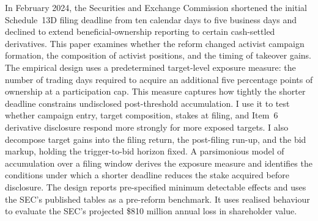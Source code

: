In February 2024, the Securities and Exchange Commission shortened the initial
Schedule~13D filing deadline from ten calendar days to five business days and
declined to extend beneficial-ownership reporting to certain cash-settled
derivatives. This paper examines whether the reform changed activist campaign
formation, the composition of activist positions, and the timing of takeover
gains. The empirical design uses a predetermined target-level exposure measure:
the number of trading days required to acquire an additional five percentage
points of ownership at a participation cap. This measure captures how tightly
the shorter deadline
constrains undisclosed post-threshold accumulation. I use it to test whether
campaign entry, target composition, stakes at filing, and Item~6 derivative
disclosure respond more strongly for more exposed targets. I also decompose
target gains into the filing return, the post-filing run-up, and the bid markup,
holding the trigger-to-bid horizon fixed. A parsimonious model of accumulation
over a filing window derives the exposure measure and identifies the conditions
under which a shorter deadline reduces the stake acquired before disclosure.
The design reports pre-specified minimum detectable effects and uses the SEC's
published tables as a pre-reform benchmark. It uses realised behaviour to
evaluate the SEC's projected \$810 million annual loss in shareholder value.
